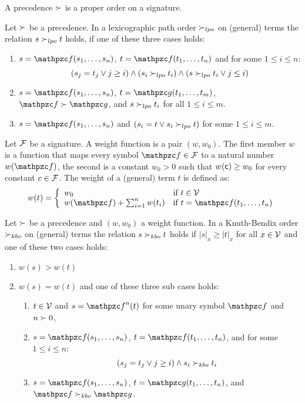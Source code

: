 \begin{definition}\label{def:prec}
	A {\myem precedence} $\succ$ is a proper order 
	on a signature.
\end{definition}

\begin{definition}[LPO]\label{def:lpo}
	Let $\succ$ be a precedence. In a {\myem lexicographic path order} $\succ_{lpo}$ on (general) terms the relation $s\succ_{lpo} t$ holds,
	if one of these three cases holds:
	\begin{enumerate}
		\item $s=\mcf(s_1,\ldots,s_n)$, $t=\mcf(t_1,\ldots,t_n)$ and for some $1\leq i\leq n$:
		\[
		(s_j=t_j\lor j\geq i) \land (s_i\succ_{lpo} t_i) \land (s\succ_{lpo} t_i \lor j\leq i)
		\]
		\item $s=\mcf(s_1,\ldots,s_n)$, $t=\mcg(t_1,\ldots,t_m)$, $\mcf\gtpre\mcg$, and $s\succ_{lpo} t_i$ for all $1\leq i\leq m$.
		\item $s=\mcf(s_1,\ldots,s_n)$ and $(s_i=t \lor s_i\succ_{lpo} t)$ for some $1\leq i\leq m$.
	\end{enumerate}
\end{definition}

\begin{definition}\label{def:weight}
	Let ${\mathcal F}$ be a signature.
	A {\myem weight function} is a pair $(w,w_0)$. 
	The first member $w$ is a function that maps every symbol $\mcf\in\mcF$ to a natural number $w(\mcf)$,
	the second is a constant $w_0>0$ such that $w({\mathsf c})\geq w_0$ for every constant $c\in{\mathcal F}$. 
	The weight of a (general) term $t$ is defined as:
	\begin{gather*}
	w(t) = \left\{ \begin{array}{ll} 
	w_0 & \text{if } t\in\mcV\\
	w(\mcf)+\sum_{i=1}^n w(t_i) & \text{if }t=\mcf(t_1,\ldots,t_n)
	\end{array}\right.
	\end{gather*}
\end{definition}

\begin{definition}[KBO]\label{def:kbo}
	Let $\succ$ be a precedence and $(w,w_0)$ a weight function.
	In a Knuth-Bendix order $\succ_{kbo}$ on (general) terms the relation $s\succ_{kbo} t$ holds if
	$|s|_x\geq|t|_x$ for all $x\in{\mathcal V}$ and one of these two cases holds:
	\begin{enumerate}
		\item $w(s) > w(t)$
		\item $w(s) = w(t)$ and one of these three sub cases holds:
		\begin{enumerate}
			\item $t\in{\mathcal V}$ and $s=\mcf^n(t)$ for some unary symbol $\mcf$ and $n\succ0$,
			\item $s=\mcf(s_1,\ldots,s_n)$, $t=\mcf(t_1,\ldots,t_n)$, and for some $1\leq i\leq n$:
			\[
			(s_j=t_j \lor j\geq i) \land s_i\succ_{kbo} t_i
			\]
			\item $s=\mcf(s_1,\ldots,s_n)$, $t=\mcg(t_1,\ldots,t_n)$, and $\mcf\gtpre_{kbo}\mcg$.
		\end{enumerate}
	\end{enumerate}
\end{definition}

